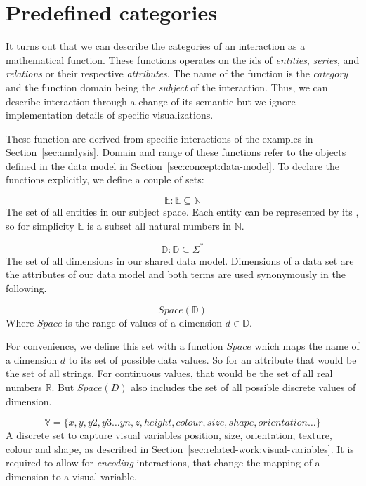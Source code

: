 \section{Predefined categories}\label{sec:concept:categories}

It turns out that we can describe the categories of an interaction as a mathematical function.
These functions operates on the ids of \emph{entities}, \emph{series}, and \emph{relations} or their respective \emph{attributes}.
The name of the function is the \emph{category} and the function domain being the \emph{subject} of the interaction.
Thus, we can describe interaction through a change of its semantic but we ignore implementation details of specific visualizations.


These function are derived from specific interactions of the examples in Section~\ref{sec:analysis}.
Domain and range of these functions refer to the objects defined in the data model in Section~\ref{sec:concept:data-model}.
To declare the functions explicitly, we define a couple of sets:

\begin{equation} \mathbb{E} : \mathbb{E} \subseteq \mathbb{N}  \end{equation}
  The set of all entities in our subject space.
  Each entity can be represented by its , so for simplicity $\mathbb{E}$ is a subset all natural numbers in $\mathbb{N}$.

\begin{equation} \mathbb{D} : \mathbb{D} \subseteq \Sigma^* \end{equation}
  The set of all dimensions in our shared data model.
  Dimensions of a data set are the attributes of our data model and both terms are used synonymously in the following.

\begin{equation} Space(\mathbb{D}) \end{equation}
  Where $Space$ is the range of values of a dimension $d \in \mathbb{D}$.

  For convenience, we define this set with a function $Space$ which maps the name of a dimension $d$ to its set of possible data values.
  So for an attribute  that would be the set of all strings.
  For continuous values, that would be the set of all real numbers $\mathbb{R}$.
  But $Space(D)$ also includes the set of all possible discrete values of dimension. 

\begin{equation} \mathbb{V} = \{x,y,y2,y3\ldots{}yn,z,height,colour,size,shape,orientation\ldots{}\} \end{equation}
  A discrete set to capture visual variables position, size, orientation, texture, colour and shape, as described in Section~\ref{sec:related-work:visual-variables}.
  It is required to allow for \emph{encoding} interactions, that change the mapping of a dimension to a visual variable.

